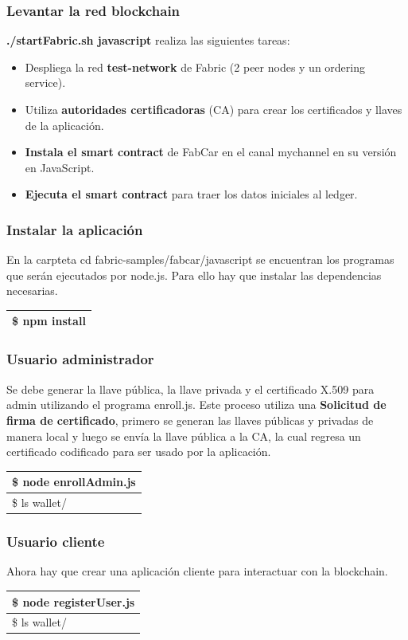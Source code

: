 \documentclass{beamer}
\begin{document}
	\begin{frame}
		\frametitle{Levantar la red blockchain}
		\textbf{./startFabric.sh javascript} realiza las siguientes tareas:
		\begin{itemize}
			\item Despliega la red \textbf{test-network} de Fabric (2 peer nodes y un ordering service).
			\item Utiliza \textbf{autoridades certificadoras} (CA) para crear los certificados y llaves de la aplicación.
			\item \textbf{Instala el smart contract} de FabCar en el canal mychannel en su versión en JavaScript.
			\item \textbf{Ejecuta el smart contract} para traer los datos iniciales al ledger.
		\end{itemize}
	\end{frame}
	
	\begin{frame}
		\frametitle{Instalar la aplicación}
		En la carpteta cd fabric-samples/fabcar/javascript se encuentran los programas que serán ejecutados por node.js. Para ello hay que instalar las dependencias necesarias.
		\begin{center}
			\begin{tabulary}{\linewidth}{L}
				\hline
				\$ npm install \\
				\hline
			\end{tabulary} 
		\end{center}
	\end{frame}
	
	\begin{frame}
		\frametitle{Usuario administrador}
		Se debe generar la llave pública, la llave privada y el certificado X.509 para admin utilizando el programa enroll.js. Este proceso utiliza una \textbf{Solicitud de firma de certificado}, primero se generan las llaves públicas y privadas de manera local y luego se envía la llave pública a la CA, la cual regresa un certificado codificado para ser usado por la aplicación. 
		\begin{center}
			\begin{tabulary}{\linewidth}{L}
				\hline
				\$ node enrollAdmin.js \\
				\hline
				\$ ls wallet/ \\
				\hline
			\end{tabulary} 
		\end{center}
	\end{frame}

	\begin{frame}
		\frametitle{Usuario cliente}
		Ahora hay que crear una aplicación cliente para interactuar con la blockchain. 
		\begin{center}
			\begin{tabulary}{\linewidth}{L}
				\hline
				\$ node registerUser.js \\
				\hline
				\$ ls wallet/ \\
				\hline
			\end{tabulary} 
		\end{center}
	\end{frame}
\end{document}
